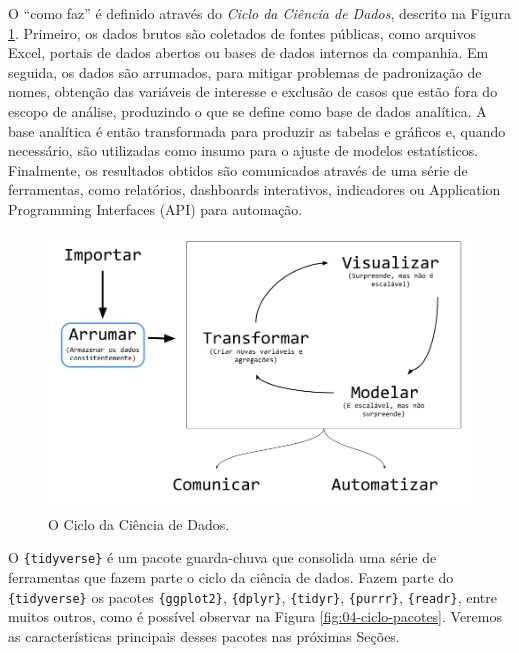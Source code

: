 \documentclass[
]{book}
\begin{document}
O ``como faz'' é definido através do \emph{Ciclo da Ciência de Dados}, descrito na Figura \ref{fig:04-ciclo}. Primeiro, os dados brutos são coletados de fontes públicas, como arquivos Excel, portais de dados abertos ou bases de dados internos da companhia. Em seguida, os dados são arrumados, para mitigar problemas de padronização de nomes, obtenção das variáveis de interesse e exclusão de casos que estão fora do escopo de análise, produzindo o que se define como base de dados analítica. A base analítica é então transformada para produzir as tabelas e gráficos e, quando necessário, são utilizadas como insumo para o ajuste de modelos estatísticos. Finalmente, os resultados obtidos são comunicados através de uma série de ferramentas, como relatórios, dashboards interativos, indicadores ou Application Programming Interfaces (API) para automação.

\begin{figure}

{\centering \includegraphics[width=13.31in]{assets/img/manipulacao/ciclo-ciencia-de-dados} 

}

\caption{O Ciclo da Ciência de Dados.}\label{fig:04-ciclo}
\end{figure}

O \texttt{\{tidyverse\}} é um pacote guarda-chuva que consolida uma série de ferramentas que fazem parte o ciclo da ciência de dados. Fazem parte do \texttt{\{tidyverse\}} os pacotes \texttt{\{ggplot2\}}, \texttt{\{dplyr\}}, \texttt{\{tidyr\}}, \texttt{\{purrr\}}, \texttt{\{readr\}}, entre muitos outros, como é possível observar na Figura \ref{fig:04-ciclo-pacotes}. Veremos as características principais desses pacotes nas próximas Seções.
\end{document}
